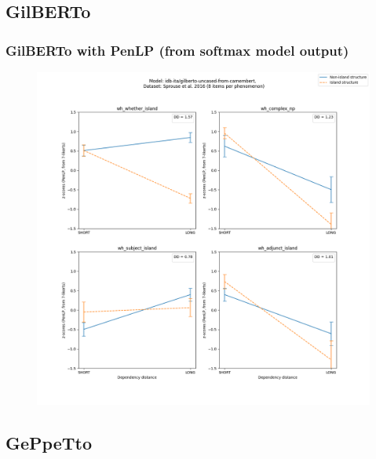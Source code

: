 \clearpage
\subsection{GilBERTo}
\subsubsection{GilBERTo with PenLP (from softmax model output)}
\begin{figure}[h]
	\centering
	\includegraphics[width=1\textwidth]{images/AppendixA/Sprouse_wh_idb-ita_gilberto-uncased-from-camembert_PenLP-zscores-likert-2022-09-16_h10m00s24.png} 
\end{figure}

\clearpage
\subsection{GePpeTto}
